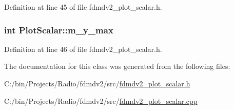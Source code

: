 Definition at line 45 of file fdmdv2\-\_\-plot\-\_\-scalar.\-h.

\hypertarget{class_plot_scalar_a91ce24595550dd2c4add253025ba668c}{
\subsubsection[{m\-\_\-y\-\_\-max}]{\setlength{\rightskip}{0pt plus 5cm}int Plot\-Scalar\-::m\-\_\-y\-\_\-max\hspace{0.3cm}{\ttfamily [protected]}}}\label{class_plot_scalar_a91ce24595550dd2c4add253025ba668c}


Definition at line 46 of file fdmdv2\-\_\-plot\-\_\-scalar.\-h.



The documentation for this class was generated from the following files\-:\begin{DoxyCompactItemize}
\item 
C\-:/bin/\-Projects/\-Radio/fdmdv2/src/\hyperlink{fdmdv2__plot__scalar_8h}{fdmdv2\-\_\-plot\-\_\-scalar.\-h}\item 
C\-:/bin/\-Projects/\-Radio/fdmdv2/src/\hyperlink{fdmdv2__plot__scalar_8cpp}{fdmdv2\-\_\-plot\-\_\-scalar.\-cpp}\end{DoxyCompactItemize}
